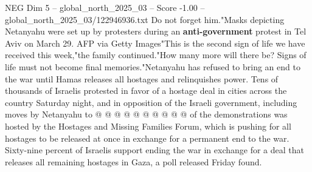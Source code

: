 \begin{textsample}{NEG Dim 5 – global\_north\_2025\_03 – Score -1.00 – global\_north\_2025\_03/122946936.txt}
Do not forget him."Masks depicting Netanyahu were set up by protesters during an \textbf{anti-government} protest in Tel Aviv on March 29.
AFP via Getty Images"This is the second sign of life we have received this week,"the family continued."How many more will there be?
Signs of life must not become final memories."Netanyahu has refused to bring an end to the war until Hamas releases all hostages and relinquishes power.
Tens of thousands of Israelis protested in favor of a hostage deal in cities across the country Saturday night, and in opposition of the Israeli government, including moves by Netanyahu to @ @ @ @ @ @ @ @ @ @ of the demonstrations was hosted by the Hostages and Missing Families Forum, which is pushing for all hostages to be released at once in exchange for a permanent end to the war.
Sixty-nine percent of Israelis support ending the war in exchange for a deal that releases all remaining hostages in Gaza, a poll released Friday found.

\end{textsample}
